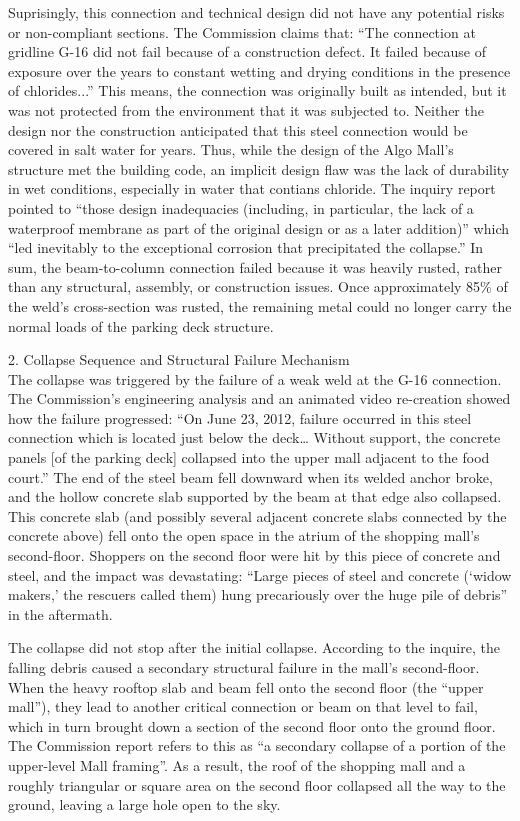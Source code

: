\documentclass[12pt]{article}
\begin{document}
Suprisingly, this connection and technical design did not have any potential risks or non-compliant sections. The Commission claims that: “The connection at gridline G-16 did not fail because of a construction defect. It failed because of exposure over the years to constant wetting and drying conditions in the presence of chlorides...” This means, the connection was originally built as intended, but it was not protected from the environment that it was subjected to. Neither the design nor the construction anticipated that this steel connection would be covered in salt water for years. Thus, while the design of the Algo Mall’s structure met the building code, an implicit design flaw was the lack of durability in wet conditions, especially in water that contians chloride. The inquiry report pointed to “those design inadequacies (including, in particular, the lack of a waterproof membrane as part of the original design or as a later addition)” which “led inevitably to the exceptional corrosion that precipitated the collapse.” In sum, the beam-to-column connection failed because it was heavily rusted, rather than  any structural, assembly, or construction issues. Once approximately 85\% of the weld’s cross-section was rusted, the remaining metal could no longer carry the normal loads of the parking deck structure.

2. Collapse Sequence and Structural Failure Mechanism \\
The collapse was triggered by the failure of a weak weld at the G-16 connection. The Commission’s engineering analysis and an animated video re-creation showed how the failure progressed: “On June 23, 2012, failure occurred in this steel connection which is located just below the deck… Without support, the concrete panels [of the parking deck] collapsed into the upper mall adjacent to the food court.” The end of the steel beam fell downward when its welded anchor broke, and the hollow concrete slab supported by the beam at that edge also collapsed. This concrete slab (and possibly several adjacent concrete slabs connected by the concrete above) fell onto the open space in the atrium of the shopping mall's second-floor. Shoppers on the second floor were hit by this piece of concrete and steel, and the impact was devastating: “Large pieces of steel and concrete (‘widow makers,’ the rescuers called them) hung precariously over the huge pile of debris” in the aftermath. 

The collapse did not stop after the initial collapse. According to the inquire, the falling debris caused a secondary structural failure in the mall’s second-floor. When the heavy rooftop slab and beam fell onto the second floor (the “upper mall”), they lead to another critical connection or beam on that level to fail, which in turn brought down a section of the second floor onto the ground floor. The Commission report refers to this as “a secondary collapse of a portion of the upper-level Mall framing”. As a result, the roof of the shopping mall and a roughly triangular or square area on the second floor collapsed all the way to the ground, leaving a large hole open to the sky.
\end{document}
